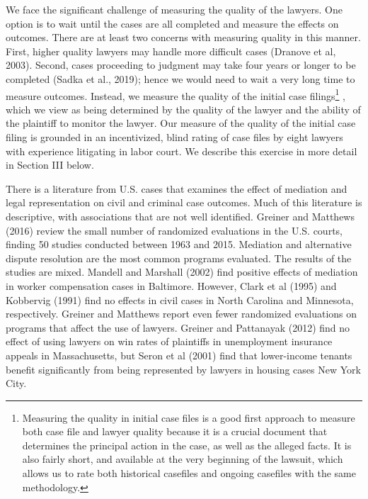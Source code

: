 \documentclass[12 pt]{article}
\begin{document}
We face the significant challenge of measuring the quality of the lawyers. One option is to wait until the cases are all completed and measure the effects on outcomes. There are at least two concerns with measuring quality in this manner. First, higher quality lawyers may handle more difficult cases (Dranove et al, 2003). Second, cases proceeding to judgment may take four years or longer to be completed (Sadka et al., 2019); hence we would need to wait a very long time to measure outcomes. Instead, we measure the quality of the initial case filings\footnote{Measuring the quality in initial case files is a good first approach to measure both case file and lawyer quality because it is a crucial document that determines the principal action in the case, as well as the alleged facts. It is also fairly short, and available at the very beginning of the lawsuit, which allows us to rate both historical casefiles and ongoing casefiles with the same methodology.} , which we view as being determined by the quality of the lawyer and the ability of the plaintiff to monitor the lawyer. Our measure of the quality of the initial case filing is grounded in an incentivized, blind rating of case files by eight lawyers with experience litigating in labor court. We describe this exercise in more detail in Section III below. 

There is a literature from U.S. cases that examines the effect of mediation and legal representation on civil and criminal case outcomes. Much of this literature is descriptive, with associations that are not well identified. Greiner and Matthews (2016) review the small number of randomized evaluations in the U.S. courts, finding 50 studies conducted between 1963 and 2015. Mediation and alternative dispute resolution are the most common programs evaluated. The results of the studies are mixed. Mandell and Marshall (2002) find positive effects of mediation in worker compensation cases in Baltimore. However, Clark et al (1995) and Kobbervig (1991) find no effects in civil cases in North Carolina and Minnesota, respectively. Greiner and Matthews report even fewer randomized evaluations on programs that affect the use of lawyers. Greiner and Pattanayak (2012) find no effect of using lawyers on win rates of plaintiffs in unemployment insurance appeals in Massachusetts, but Seron et al (2001) find that lower-income tenants benefit significantly from being represented by lawyers in housing cases New York City. 
\end{document}

